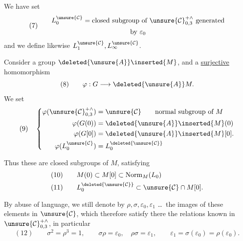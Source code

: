 We have set
\[
(7)\qquad
\begin{gathered}
L_0^{\unsure{\mathcal C}}=\text{closed subgroup of }
\unsure{\mathcal C}_{0,3}^{+\wedge}\text{ generated}\\
\text{by }\varepsilon_0
\end{gathered}
\]
and we define likewise $L_1^{\unsure{\mathcal C}},L_{\infty}^{\unsure{\mathcal C}}$.

Consider a  group
$\deleted{\unsure{A}}\inserted{M}$, and a 
\uline{surjective} homomorphism
\[
(8)\qquad \varphi:G\longrightarrow\deleted{\unsure{A}}M.
\]
We set
\[
(9)\quad
\left\{\begin{aligned}
\varphi(\unsure{\mathcal C}_{0,3}^{+\wedge})
 &=\unsure{\mathcal C}\qquad\text{normal subgroup of }M\\
\varphi(G(0))&=\deleted{\unsure{A}}\inserted{M}(0)\\
\varphi(G[0])&=\deleted{\unsure{A}}\inserted{M}[0].\\
\varphi(L_0^{\unsure{\mathcal C}})&=L_0^{\deleted{\unsure{\mathcal C}}}
\end{aligned}\right.
\]


Thus these are closed subgroups of $M$, satisfying
\[
\begin{aligned}
(10)\qquad&M(0)\subset M[0]\subset\operatorname{Norm}_{M}(L_0)\\
(11)\qquad&L_0^{\deleted{\unsure{\mathcal C}}}
\subset\unsure{\mathcal C}\cap M[0].
\end{aligned}
\]

By abuse of language, we still denote by $\rho,\sigma,\varepsilon_0,\varepsilon_1$
\ldots\ the images of these elements in $\unsure{\mathcal C}$, which
therefore satisfy there the relations known in $\unsure{\mathcal C}_{0,3}^{+\wedge}$,
in particular
\[
(12)\qquad
\sigma^2=\rho^3=1,\qquad
\sigma\rho=\varepsilon_0,\quad \rho\sigma=\varepsilon_1,\qquad
\varepsilon_1=\sigma(\varepsilon_0)=\rho(\varepsilon_0).
\]

